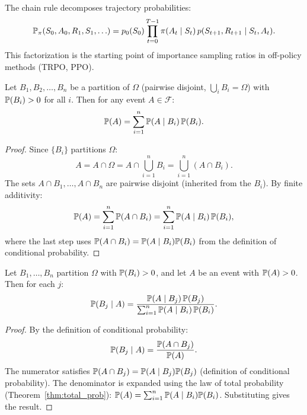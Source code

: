 \documentclass[11pt,a4paper]{article}
\begin{document}
\begin{rlconnection}[title={Connection to RL}]
The chain rule decomposes trajectory probabilities:
\[
  \mathbb{P}_\pi(S_0, A_0, R_1, S_1, \ldots)
  = p_0(S_0) \prod_{t=0}^{T-1} \pi(A_t \mid S_t)\,
    p(S_{t+1}, R_{t+1} \mid S_t, A_t).
\]
This factorization is the starting point of importance sampling ratios
in off-policy methods (TRPO, PPO).
\end{rlconnection}

\begin{keyresult}[title={Law of Total Probability}]
\begin{theorem}
\label{thm:total_prob}
Let $B_1, B_2, \ldots, B_n$ be a partition of $\Omega$ (pairwise disjoint,
$\bigcup_i B_i = \Omega$) with $\mathbb{P}(B_i) > 0$ for all $i$. Then for any
event $A \in \mathcal{F}$:
\begin{equation}
  \mathbb{P}(A) = \sum_{i=1}^n \mathbb{P}(A \mid B_i)\, \mathbb{P}(B_i).
  \label{eq:total_prob}
\end{equation}
\end{theorem}
\end{keyresult}

\begin{proof}
Since $\{B_i\}$ partitions $\Omega$:
\[
  A = A \cap \Omega = A \cap \bigcup_{i=1}^n B_i
  = \bigcup_{i=1}^n (A \cap B_i).
\]
The sets $A \cap B_1, \ldots, A \cap B_n$ are pairwise disjoint (inherited
from the $B_i$). By finite additivity:
\[
  \mathbb{P}(A) = \sum_{i=1}^n \mathbb{P}(A \cap B_i)
  = \sum_{i=1}^n \mathbb{P}(A \mid B_i)\, \mathbb{P}(B_i),
\]
where the last step uses $\mathbb{P}(A \cap B_i) = \mathbb{P}(A \mid B_i) \mathbb{P}(B_i)$
from the definition of conditional probability.
\end{proof}

\begin{keyresult}[title={Bayes' Theorem}]
\begin{theorem}
\label{thm:bayes}
Let $B_1, \ldots, B_n$ partition $\Omega$ with $\mathbb{P}(B_i) > 0$, and let
$A$ be an event with $\mathbb{P}(A) > 0$. Then for each $j$:
\begin{equation}
  \mathbb{P}(B_j \mid A)
  = \frac{\mathbb{P}(A \mid B_j)\, \mathbb{P}(B_j)}
         {\sum_{i=1}^n \mathbb{P}(A \mid B_i)\, \mathbb{P}(B_i)}.
  \label{eq:bayes}
\end{equation}
\end{theorem}
\end{keyresult}

\begin{proof}
By the definition of conditional probability:
\[
  \mathbb{P}(B_j \mid A) = \frac{\mathbb{P}(A \cap B_j)}{\mathbb{P}(A)}.
\]
The numerator satisfies $\mathbb{P}(A \cap B_j) = \mathbb{P}(A \mid B_j) \mathbb{P}(B_j)$
(definition of conditional probability). The denominator is expanded using
the law of total probability (Theorem~\ref{thm:total_prob}):
$\mathbb{P}(A) = \sum_{i=1}^n \mathbb{P}(A \mid B_i) \mathbb{P}(B_i)$.
Substituting gives the result.
\end{proof}
\end{document}
